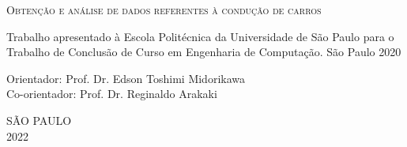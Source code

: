\begin{titlepage}
\vfill
\begin{center}
    \vspace{2cm}
    {\Large \textsc{Obtenção e análise de dados referentes à condução de carros}\\}
    \vspace{1cm}
    \hspace{.45\linewidth}
    \begin{minipage}{.50\linewidth}

            Trabalho apresentado à Escola Politécnica da Universidade de São Paulo para
            o Trabalho de Conclusão de Curso em Engenharia de Computação.
            São Paulo
            2020

            \vspace{0.5 cm}

            Orientador:     Prof. Dr. Edson Toshimi Midorikawa\\
            Co-orientador: Prof. Dr. Reginaldo Arakaki\\
    
    \end{minipage}

    \vspace{2cm}
    \vfill
    {\large SÃO PAULO\\ 2022}
\end{center}

\end{titlepage}